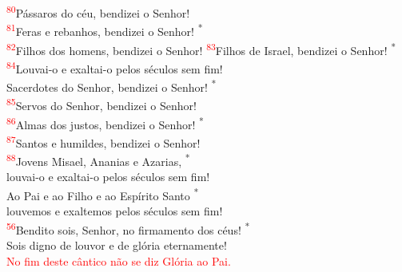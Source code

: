 \documentclass{book}
\begin{document}
\begin{center}
    \textsuperscript{\textcolor{red}{80}}Pássaros do céu, bendizei o Senhor! \\
    \textsuperscript{\underline{\hspace{.06in}}\textcolor{red}{81}}Feras e rebanhos, bendizei o Senhor! \textsuperscript{*} \\
    \textsuperscript{\textcolor{red}{82}}Filhos dos homens, bendizei o Senhor!
    \newpage
    \textsuperscript{\underline{\hspace{.06in}}\textcolor{red}{83}}Filhos de Israel, bendizei o Senhor! \textsuperscript{*} \\
    \textsuperscript{\textcolor{red}{84}}Louvai-o e exaltai-o pelos séculos sem fim! \\
    \textsuperscript{\underline{\hspace{.06in}}} Sacerdotes do Senhor, bendizei o Senhor! \textsuperscript{*} \\
    \textsuperscript{\textcolor{red}{85}}Servos do Senhor, bendizei o Senhor!
    \vspace{.2cm} \\
    \textsuperscript{\underline{\hspace{.06in}}\textcolor{red}{86}}Almas dos justos, bendizei o Senhor! \textsuperscript{*} \\
    \textsuperscript{\textcolor{red}{87}}Santos e humildes, bendizei o Senhor! \\
    \textsuperscript{\underline{\hspace{.06in}}\textcolor{red}{88}}Jovens Misael, Ananias e Azarias, \textsuperscript{*} \\
    louvai-o e exaltai-o pelos séculos sem fim!
    \vspace{.2cm} \\
    \textsuperscript{\underline{\hspace{.06in}}} Ao Pai e ao Filho e ao Espírito Santo \textsuperscript{*} \\
    louvemos e exaltemos pelos séculos sem fim! \\
    \textsuperscript{\underline{\hspace{.06in}}\textcolor{red}{56}}Bendito sois, Senhor, no firmamento dos céus! \textsuperscript{*} \\
    Sois digno de louvor e de glória eternamente!
    \vspace{.2cm} \\
    \textcolor{red}{\small No fim deste cântico não se diz Glória ao Pai.}
    \vspace{.2cm} \\

\end{center}
\end{document}

